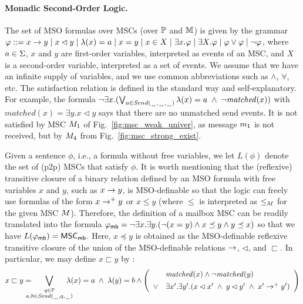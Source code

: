 \documentclass{article}
\begin{document}
\paragraph*{Monadic Second-Order Logic.}
The set of MSO formulas over MSCs (over $\mathbb{P}$ and $\mathbb{M}$) is given by the grammar
$
\varphi ::= x \to y \mid x \lhd y \mid \lambda(x) = a \mid x = y \mid x \in X \mid \exists x.\varphi \mid \exists X.\varphi \mid \varphi \vee \varphi \mid \neg \varphi
$,
where $a \in \Sigma$, $x$ and $y$ are first-order variables, interpreted as
events of an MSC, and $X$ is a second-order variable, interpreted
as a set of events. We assume that we have an infinite supply of variables,
and we use common abbreviations such as $\wedge$, $\forall$, etc.
The satisfaction relation is defined in the standard way and self-explanatory.
For example, the formula $\neg\exists x.(\bigvee_{a \in {\mathit{Send}(\hspace{0.1em}\underline{\hspace{0.5em}}\hspace{0.1em},\hspace{0.1em}\underline{\hspace{0.5em}}\hspace{0.1em},\hspace{0.1em}\underline{\hspace{0.5em}}\hspace{0.1em})}} \lambda(x) = a \;\wedge\; \neg \mathit{matched}(x))$
with $\mathit{matched}(x) = \exists y.x \lhd y$
says that there are no unmatched send events.
It is not satisfied by  MSC $M_{1}$
of Fig.~\ref{fig:msc_weak_univer},
as message $m_1$ is not received,
but by $M_{4}$ from Fig.~\ref{fig:msc_strong_exist}.

Given a sentence $\phi$, i.e., a formula without free variables,
we let $L(\phi)$ denote the set of (p2p) MSCs that satisfy $\phi$.
%
It is worth mentioning that the (reflexive) transitive closure of
a binary relation defined by an MSO formula with free variables $x$ and $y$,
such as $x \to y$, is MSO-definable so that the logic can freely
use formulas of the form $x \to^+ y$ or $x \le y$ (where $\le$
is interpreted as $\le_M$ for the given MSC $M$).
Therefore, the definition of a mailbox MSC can be readily translated into
the formula $\varphi_{\mathsf{mb}} = \neg \exists x.\exists y.(\neg (x = y) \wedge x \preceq y \wedge y \preceq x)$ so that we have $L(\varphi_{\mathsf{mb}}) = \mathsf{MSC}_{\mathsf{mb}}$.
Here, $x \preceq y$ is obtained as the MSO-definable reflexive transitive closure of
the union of the MSO-definable relations $\to$, $\lhd$, and $\sqsubset$.
In particular, we may define $x \sqsubset y$ by :
\[
x \sqsubset y =
\displaystyle
\hspace{-1em}\bigvee_{\substack{q \in \mathbb{P}\\a,b \in {\mathit{Send}(\hspace{0.1em}\underline{\hspace{0.5em}}\hspace{0.1em},q,\hspace{0.1em}\underline{\hspace{0.5em}}\hspace{0.1em})}}}\hspace{-1em}
\lambda(x) = a \;\wedge\; \lambda(y) = b
\wedge
\left(
\begin{array}{rl}
& \mathit{matched}(x) \wedge \neg \mathit{matched}(y)\\[1ex]
\vee & \exists x'.\exists y'. (x \lhd x' \;\wedge\; y \lhd y' \;\wedge\; x' \to^+ y')
\end{array}
\right)
\]
\end{document}

